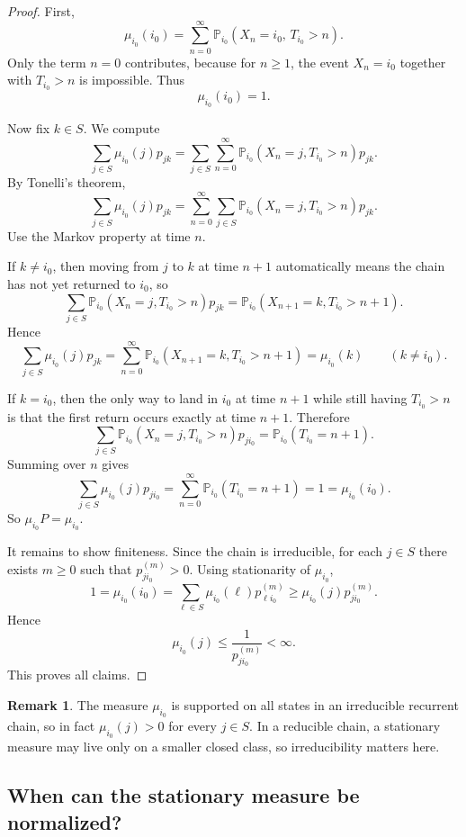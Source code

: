 \documentclass[11pt]{article}
\theoremstyle{definition}
\newtheorem{remark}[theorem]{Remark}
\begin{document}
\begin{proof}
First,
\[
\mu_{i_0}(i_0)
=
\sum_{n=0}^{\infty}
\mathbb P_{i_0}(X_n=i_0,\,T_{i_0}>n).
\]
Only the term \(n=0\) contributes, because for \(n\ge 1\), the event \(X_n=i_0\) together with \(T_{i_0}>n\) is impossible. Thus
\[
\mu_{i_0}(i_0)=1.
\]

Now fix \(k\in S\). We compute
\[
\sum_{j\in S}\mu_{i_0}(j)p_{jk}
=
\sum_{j\in S}\sum_{n=0}^{\infty}
\mathbb P_{i_0}(X_n=j,T_{i_0}>n)p_{jk}.
\]
By Tonelli's theorem,
\[
\sum_{j\in S}\mu_{i_0}(j)p_{jk}
=
\sum_{n=0}^{\infty}\sum_{j\in S}
\mathbb P_{i_0}(X_n=j,T_{i_0}>n)p_{jk}.
\]
Use the Markov property at time \(n\).

If \(k\neq i_0\), then moving from \(j\) to \(k\) at time \(n+1\) automatically means the chain has not yet returned to \(i_0\), so
\[
\sum_{j\in S}
\mathbb P_{i_0}(X_n=j,T_{i_0}>n)p_{jk}
=
\mathbb P_{i_0}(X_{n+1}=k,T_{i_0}>n+1).
\]
Hence
\[
\sum_{j\in S}\mu_{i_0}(j)p_{jk}
=
\sum_{n=0}^{\infty}
\mathbb P_{i_0}(X_{n+1}=k,T_{i_0}>n+1)
=
\mu_{i_0}(k)
\qquad (k\neq i_0).
\]

If \(k=i_0\), then the only way to land in \(i_0\) at time \(n+1\) while still having \(T_{i_0}>n\) is that the first return occurs exactly at time \(n+1\). Therefore
\[
\sum_{j\in S}
\mathbb P_{i_0}(X_n=j,T_{i_0}>n)p_{ji_0}
=
\mathbb P_{i_0}(T_{i_0}=n+1).
\]
Summing over \(n\) gives
\[
\sum_{j\in S}\mu_{i_0}(j)p_{ji_0}
=
\sum_{n=0}^{\infty}\mathbb P_{i_0}(T_{i_0}=n+1)
=
1
=
\mu_{i_0}(i_0).
\]
So \(\mu_{i_0}P=\mu_{i_0}\).

It remains to show finiteness. Since the chain is irreducible, for each \(j\in S\) there exists \(m\ge 0\) such that \(p_{ji_0}^{(m)}>0\). Using stationarity of \(\mu_{i_0}\),
\[
1
=
\mu_{i_0}(i_0)
=
\sum_{\ell\in S}\mu_{i_0}(\ell)p_{\ell i_0}^{(m)}
\ge
\mu_{i_0}(j)p_{ji_0}^{(m)}.
\]
Hence
\[
\mu_{i_0}(j)
\le
\frac{1}{p_{ji_0}^{(m)}}
<\infty.
\]
This proves all claims.
\end{proof}

\begin{remark}
The measure \(\mu_{i_0}\) is supported on all states in an irreducible recurrent chain, so in fact \(\mu_{i_0}(j)>0\) for every \(j\in S\). In a reducible chain, a stationary measure may live only on a smaller closed class, so irreducibility matters here.
\end{remark}

\subsection{When can the stationary measure be normalized?}
\end{document}
